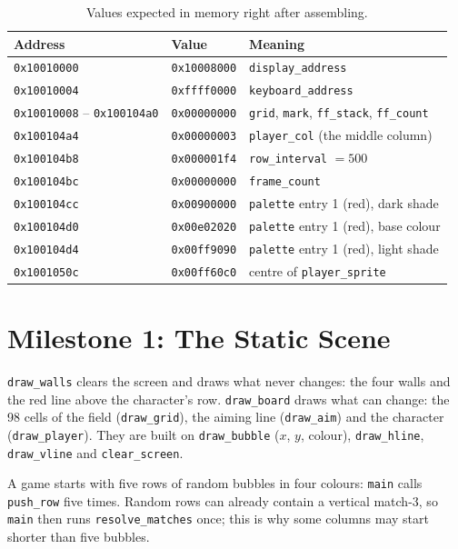 \documentclass[11pt]{article}
\newcommand{\code}[1]{\texttt{#1}}
\begin{document}
\begin{table}[H]
\centering
\small
\begin{tabular}{@{}lll@{}}
\toprule
Address & Value & Meaning\\
\midrule
\code{0x10010000} & \code{0x10008000} & \code{display\_address}\\
\code{0x10010004} & \code{0xffff0000} & \code{keyboard\_address}\\
\code{0x10010008} -- \code{0x100104a0} & \code{0x00000000} & \code{grid}, \code{mark}, \code{ff\_stack}, \code{ff\_count}\\
\code{0x100104a4} & \code{0x00000003} & \code{player\_col} (the middle column)\\
\code{0x100104b8} & \code{0x000001f4} & \code{row\_interval} $= 500$\\
\code{0x100104bc} & \code{0x00000000} & \code{frame\_count}\\
\code{0x100104cc} & \code{0x00900000} & \code{palette} entry 1 (red), dark shade\\
\code{0x100104d0} & \code{0x00e02020} & \code{palette} entry 1 (red), base colour\\
\code{0x100104d4} & \code{0x00ff9090} & \code{palette} entry 1 (red), light shade\\
\code{0x1001050c} & \code{0x00ff60c0} & centre of \code{player\_sprite}\\
\bottomrule
\end{tabular}
\caption{Values expected in memory right after assembling.}
\label{tab:expected}
\end{table}

\section{Milestone 1: The Static Scene}

\code{draw\_walls} clears the screen and draws what never changes: the four
walls and the red line above the character's row. \code{draw\_board} draws
what can change: the 98 cells of the field (\code{draw\_grid}), the aiming
line (\code{draw\_aim}) and the character (\code{draw\_player}). They are built on \code{draw\_bubble}
($x$, $y$, colour), \code{draw\_hline}, \code{draw\_vline} and
\code{clear\_screen}.

A game starts with five rows of random bubbles in four colours: \code{main}
calls \code{push\_row} five times. Random rows can already contain a vertical
match-3, so \code{main} then runs \code{resolve\_matches} once; this is why
some columns may start shorter than five bubbles.
\end{document}
